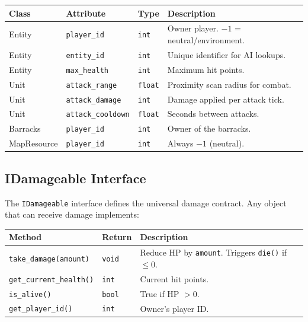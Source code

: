 \documentclass[11pt,a4paper]{article}
\begin{document}
\begin{center}
\begin{tabular}{|l|l|l|p{6cm}|}
\hline
\textbf{Class} & \textbf{Attribute} & \textbf{Type} & \textbf{Description} \\
\hline
Entity          & \texttt{player\_id}  & \texttt{int} & Owner player. $-1$ = neutral/environment. \\
Entity          & \texttt{entity\_id}  & \texttt{int} & Unique identifier for AI lookups. \\
Entity          & \texttt{max\_health} & \texttt{int} & Maximum hit points. \\
Unit            & \texttt{attack\_range}   & \texttt{float} & Proximity scan radius for combat. \\
Unit            & \texttt{attack\_damage}  & \texttt{int}   & Damage applied per attack tick. \\
Unit            & \texttt{attack\_cooldown}& \texttt{float} & Seconds between attacks. \\
Barracks        & \texttt{player\_id}  & \texttt{int} & Owner of the barracks. \\
MapResource     & \texttt{player\_id}  & \texttt{int} & Always $-1$ (neutral). \\
\hline
\end{tabular}
\end{center}

\subsection{IDamageable Interface}

The \texttt{IDamageable} interface defines the universal damage contract.
Any object that can receive damage implements:

\begin{center}
\begin{tabular}{|l|l|p{7cm}|}
\hline
\textbf{Method} & \textbf{Return} & \textbf{Description} \\
\hline
\texttt{take\_damage(amount)} & \texttt{void} & Reduce HP by \texttt{amount}. Triggers \texttt{die()} if $\leq 0$. \\
\texttt{get\_current\_health()} & \texttt{int} & Current hit points. \\
\texttt{is\_alive()} & \texttt{bool} & True if HP $> 0$. \\
\texttt{get\_player\_id()} & \texttt{int} & Owner's player ID. \\
\hline
\end{tabular}
\end{center}
\end{document}
